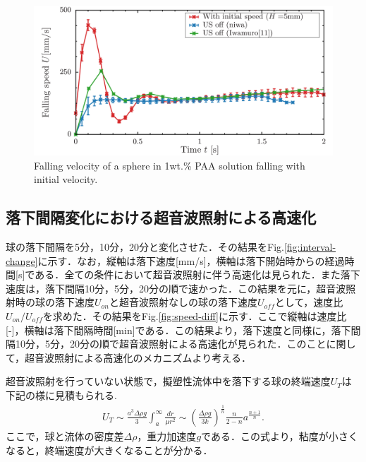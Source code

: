 \begin{figure}[ht]
    \begin{center}
        \includegraphics[width=15cm,clip]{5-Discussion/h-5.png}
        \caption{Falling velocity of a sphere in 1wt.\% PAA solution falling with initial velocity.}
        \label{fig:h-5}
    \end{center}
\end{figure}

\clearpage

\subsection{落下間隔変化における超音波照射による高速化}

球の落下間隔を5分，10分，20分と変化させた．その結果をFig.\ref{fig:interval-change}に示す．なお，縦軸は落下速度[mm/s]，横軸は落下開始時からの経過時間[s]である．全ての条件において超音波照射に伴う高速化は見られた．また落下速度は，落下間隔10分，5分，20分の順で速かった．この結果を元に，超音波照射時の球の落下速度$U_{on}$と超音波照射なしの球の落下速度$U_{off}$として，速度比$U_{on}/U_{off}$を求めた．その結果をFig.\ref{fig:speed-diff}に示す．ここで縦軸は速度比[-]，横軸は落下間隔時間[min]である．この結果より，落下速度と同様に，落下間隔10分，5分，20分の順で超音波照射による高速化が見られた．このことに関して，超音波照射による高速化のメカニズムより考える．

超音波照射を行っていない状態で，擬塑性流体中を落下する球の終端速度$U_T$は下記の様に見積もられる\cite{ref:8}.
\begin{eqnarray}
    U_T \sim \frac{a^3\Delta\rho g}{3}  \int^{\infty}_{a} \frac{dr}{\mu r^2} \sim \left(\frac{\Delta \rho g}{3k}\right)^{\frac{1}{n}}\frac{n}{2-n}a^{\frac{n+1}{n}} .
    \label{eq:UT}
\end{eqnarray}
ここで，球と流体の密度差$\Delta \rho$，重力加速度$g$である．この式より，粘度が小さくなると，終端速度が大きくなることが分かる．

